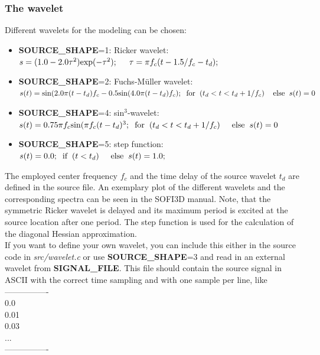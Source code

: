 \subsubsection*{The wavelet}
Different wavelets for the modeling can be chosen:
\begin{itemize}
 \item \textbf{SOURCE\_SHAPE}=1: Ricker wavelet:\\ $s=(1.0-2.0\tau ^2)\text{exp}(-\tau ^2); \hspace{0.5cm}	\tau=\pi f_c(t-1.5/f_c-t_d);$	
\item \textbf{SOURCE\_SHAPE}=2: Fuchs-M\"uller wavelet:\\ $s(t)=\text{sin}(2.0\pi (t-t_d)f_c-0.5 \text{sin}(4.0\pi (t-t_d)f_c); \hspace{0.2cm}\text{for}\hspace{0.2cm}(t_d<t<t_d+1/f_c) \hspace{0.4cm}\text{else}\hspace{0.2cm} s(t)=0$
\item \textbf{SOURCE\_SHAPE}=4: sin$^3$-wavelet:\\ $s(t)=0.75\pi f_c\text{sin}(\pi f_c(t-t_d)^3;\hspace{0.2cm}\text{for}\hspace{0.2cm}(t_d<t<t_d+1/f_c) \hspace{0.5cm}\text{else}\hspace{0.2cm} s(t)=0$
\item \textbf{SOURCE\_SHAPE}=5: step function:\\ $s(t)=0.0; \hspace{0.2cm}\text{if}\hspace{0.2cm}(t<t_d) \hspace{0.5cm}\text{else} \hspace{0.2cm} s(t)=1.0; $
\end{itemize}
The employed center frequency $f_c$ and the time delay of the source wavelet $t_d$ are defined in the source file. An exemplary plot of the different wavelets and the corresponding spectra can be seen in the SOFI3D manual. 
Note, that the symmetric Ricker wavelet is delayed and its maximum period is excited at the source location after one period. The step function is used for the calculation of the diagonal Hessian approximation. \\
If you want to define your own wavelet, you can include this either in the source code in \textit{src/wavelet.c} or use \textbf{SOURCE\_SHAPE}=3 and read in an external wavelet from \textbf{SIGNAL\_FILE}. 
This file should contain the source signal in ASCII with the correct time sampling and with one sample per line, like \\
----------------\\
0.0\\
0.01\\
0.03\\
...\\
----------------

